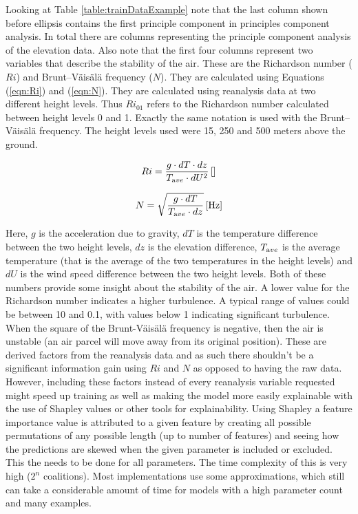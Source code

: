 Looking at Table \ref{table:trainDataExample} note that the last column shown before ellipsis contains the first principle component in principles component analysis. In total there are \nPCA columns representing the principle component analysis of the elevation data. Also note that the first four columns represent two variables that describe the stability of the air. These are the Richardson number ($Ri$)\cite{richardson_number_skybrary} and Brunt–Väisälä frequency\cite{brunt_vaisala_freq_eumtrain} ($N$). They are calculated using Equations (\ref{eqn:Ri}) and (\ref{eqn:N})\cite{mean_gust_HA_HO}. They are calculated using reanalysis data at two different height levels. Thus $Ri_{01}$ refers to the Richardson number calculated between height levels 0 and 1. Exactly the same notation is used with the Brunt–Väisälä frequency. The height levels used were 15, 250 and 500 meters above the ground.

\begin{equation}
    \label{eqn:Ri}
    Ri = \frac{g \cdot dT \cdot dz}{T_{\textrm ave} \cdot dU^2} \, \mathrm{[]}
\end{equation}

\begin{equation}
    \label{eqn:N}
    N = \sqrt{\frac{g \cdot dT }{T_{\textrm ave} \cdot dz}} \, \mathrm{[Hz]}
\end{equation}

Here, $g$ is the acceleration due to gravity, $dT$ is the temperature difference between the two height levels, $dz$ is the elevation difference, $T_{\textrm ave}$ is the average temperature (that is the average of the two temperatures in the height levels) and $dU$ is the wind speed difference between the two height levels. Both of these numbers provide some insight about the stability of the air. A lower value for the Richardson number indicates a higher turbulence. A typical range of values could be between 10 and 0.1, with values below 1 indicating significant turbulence\cite{richardson_number_skybrary}. When the square of the Brunt-Väisälä frequency is negative, then the air is unstable (an air parcel will move away from its original position)\cite{brunt_vaisala_freq_eumtrain}. These are derived factors from the reanalysis data and as such there shouldn't be a significant information gain using $Ri$ and $N$ as opposed to having the raw data. However, including these factors instead of every reanalysis variable requested might speed up training as well as making the model more easily explainable with the use of Shapley values or other tools for explainability. Using Shapley a feature importance value is attributed to a given feature by creating all possible permutations of any possible length (up to number of features) and seeing how the predictions are skewed when the given parameter is included or excluded. This the needs to be done for all parameters. The time complexity of this is very high ($2^n$ coalitions)\cite{shapley_information}. Most implementations use some approximations, which still can take a considerable amount of time for models with a high parameter count and many examples.

